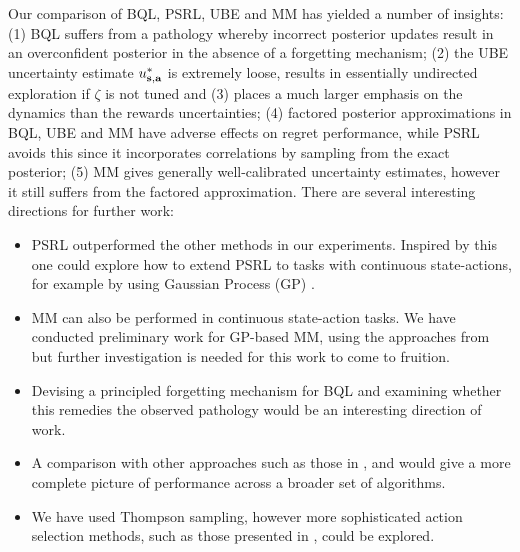\documentclass{article}
\begin{document}
Our comparison of BQL, PSRL, UBE and MM has yielded a number of insights: (1) BQL suffers from a pathology whereby incorrect posterior updates result in an overconfident posterior in the absence of a forgetting mechanism; (2) the UBE uncertainty estimate $u^*_{\mathbf{s}, \mathbf{a}}$ is extremely loose, results in essentially undirected exploration if $\zeta$ is not tuned and (3) places a much larger emphasis on the dynamics than the rewards uncertainties; (4) factored posterior approximations in BQL, UBE and MM have adverse effects on regret performance, while PSRL avoids this since it incorporates correlations by sampling from the exact posterior; (5) MM gives generally well-calibrated uncertainty estimates, however it still suffers from the factored approximation. There are several interesting directions for further work:
\begin{itemize}
\item PSRL outperformed the other methods in our experiments. Inspired by this one could explore how to extend PSRL to tasks with continuous state-actions, for example by using Gaussian Process (GP) \citep{gps_textbook}.
\item MM can also be performed in continuous state-action tasks. We have conducted preliminary work for GP-based MM, using the approaches from \cite{gpsinrl, quintechrep} but further investigation is needed for this work to come to fruition.
\item Devising a principled forgetting mechanism for BQL and examining whether this remedies the observed pathology would be an interesting direction of work.
\item A comparison with other approaches such as those in \cite{bdqn}, \cite{su} and \cite{rlvi} would give a more complete picture of performance across a broader set of algorithms.
\item We have used Thompson sampling, however more sophisticated action selection methods, such as those presented in \cite{bqlearning}, could be explored.
\end{itemize}

\clearpage



\end{document}
